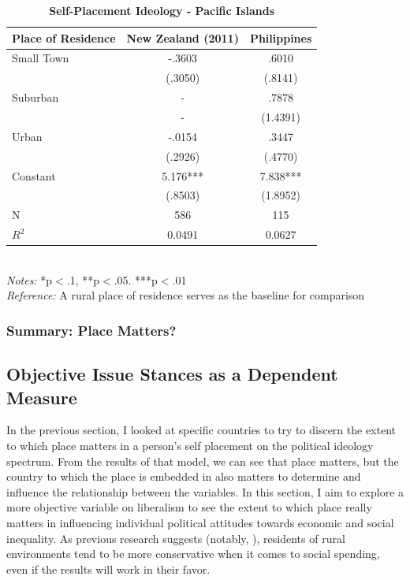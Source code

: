 \documentclass[12pt, titlepage]{article}
\newcommand\e{\emph}
\newcommand\tb{\textbf}
\begin{document}
\begin{landscape}
	\begin{table}
		\centering
		\def\arraystretch{1.5}
		\caption{\tb{Self-Placement Ideology - Pacific Islands}}
		\begin{tabulary}{\linewidth}{l c c }
			\\
			\hline
			\tb{Place of Residence}&\tb{New Zealand (2011)}&\tb{Philippines}\\
			\hline
			Small Town & -.3603  & .6010  \\      
			& (.3050) & (.8141)    \\
			Suburban  & -   & .7878  \\ 
			 & -   & (1.4391)       \\
			Urban  & -.0154   & .3447 \\
			 &(.2926)   & (.4770)      \\
			Constant  & 5.176***  & 7.838***   \\
			&(.8503)&(1.8952) \\
			N  &586 & 115  \\
			$R^2$  &0.0491  &0.0627     \\
			\hline                                       
		\end{tabulary} 
		\\
		\e{Notes:} *p$<$.1, **p$<$.05. ***p$<$.01 \\
		\e{Reference:} A rural place of residence serves as the baseline for comparison
		\label{table13}
	\end{table}
\end{landscape}


\subsubsection{Summary: Place Matters?}

\subsection{Objective Issue Stances as a Dependent Measure}

In the previous section, I looked at specific countries to try to discern the extent to which place matters in a person's self placement on the political ideology spectrum. From the results of that model, we can see that place matters, but the country to which the place is embedded in also matters to determine and influence the relationship between the variables. In this section, I aim to explore a more objective variable on liberalism to see the extent to which place really matters in influencing individual political attitudes towards economic and social inequality. As previous research suggests (notably, \cite{walsh_putting_2012}), residents of rural environments tend to be more conservative when it comes to social spending, even if the results will work in their favor. 
\end{document}
